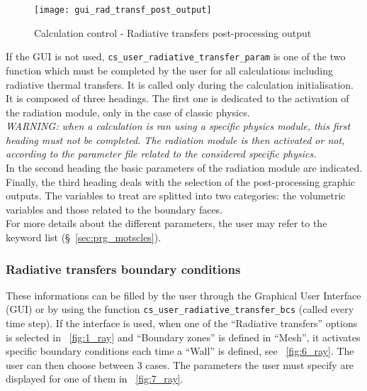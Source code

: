 \begin{figure}[ht]
\begin{center}
\texttt{[image: gui\_rad\_transf\_post\_output]}
\caption{Calculation control - Radiative transfers post-processing output}
\label{fig:5_ray}
\end{center}
\end{figure}

If the GUI is not used, \texttt{cs\_user\_radiative\_transfer\_param} is one of the two function which must be completed by the user for all
calculations including radiative thermal transfers. It is called only during the calculation initialisation. It is composed of three headings. The first one is dedicated to the activation
of the radiation module, only in the case of classic physics. \\
{\em WARNING: when a calculation is ran using a specific physics module,
this first heading must not be completed. The radiation module is then
activated or not, according to the parameter file related to the considered
specific physics.} \\

\noindent
In the second heading the basic parameters of the radiation module are indicated.\\
Finally, the third heading deals with the selection of the
post-processing graphic outputs. The variables to treat are splitted
into two categories: the volumetric variables and those related to the
boundary faces.\\

\noindent
For more details about the different parameters, the user may refer to the
keyword list (\S~\ref{sec:prg_motscles}).


\subsubsection{Radiative transfers boundary conditions}
These informations can be filled by the user through the Graphical User Interface
(GUI) or by using the function \texttt{cs\_user\_radiative\_transfer\_bcs} (called every time step). If the
interface is used, when one of the ``Radiative transfers'' options is selected in
\figurename~\ref{fig:1_ray} and ``Boundary zones'' is defined in ``Mesh'', it activates specific boundary conditions each time
a ``Wall'' is defined, see \figurename~\ref{fig:6_ray}. The user can then choose
between 3 cases. The parameters the user must specify are displayed for one of
them in \figurename~\ref{fig:7_ray}.

